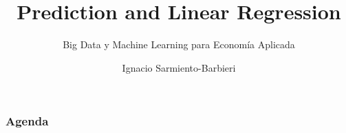 \documentclass[
  shownotes,
  xcolor={svgnames},
  hyperref={colorlinks,citecolor=DarkBlue,linkcolor=andesred,urlcolor=DarkBlue}
  , aspectratio=169]{beamer}
\begin{document}
\title{Prediction and Linear Regression}
\subtitle{Big Data y Machine Learning para Economía Aplicada}
\date{}

\author[Sarmiento-Barbieri]{Ignacio Sarmiento-Barbieri}


\begin{frame}[noframenumbering]
\maketitle
\end{frame}





\begin{frame}
\frametitle{Agenda}

\tableofcontents


\end{frame}




\end{document}
